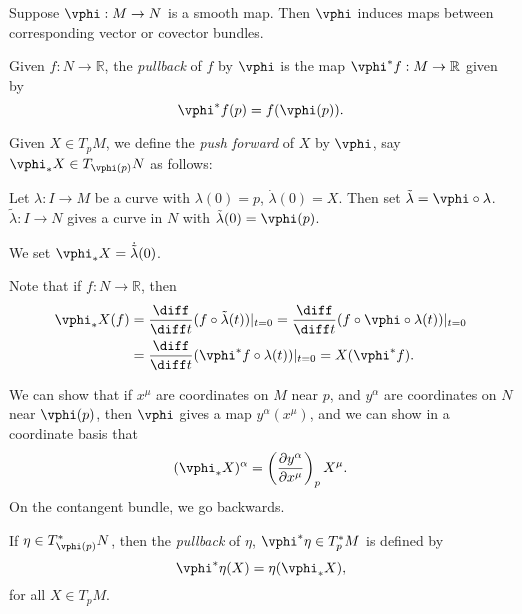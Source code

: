 \documentclass[12pt]{article}
\begin{document}
Suppose $\vphi : M \to N$ is a smooth map. Then $\vphi$ induces maps between corresponding vector or covector bundles.

\begin{definition}
	Given $f : N \to \mathbb{R}$, the \emph{pullback} of $f$ by $\vphi$ is the map $\vphi^{\ast}f : M \to \mathbb{R}$ given by
	\[
	\vphi^{\ast} f(p) = f(\vphi(p)).
	\]
\end{definition}

\begin{definition}
	Given $X \in T_pM$, we define the \emph{push forward} of $X$ by $\vphi$, say $\vphi_\ast X \in T_{\vphi(p)}N$ as follows:

	Let $\lambda : I \to M$ be a curve with $\lambda(0) = p$, $\dot \lambda(0) = X$. Then set $\tilde \lambda = \vphi \circ \lambda$. $\tilde \lambda : I \to N$ gives a curve in $N$ with $\tilde \lambda(0) = \vphi(p)$.

	We set $\vphi_\ast X = \dot{\tilde \lambda}(0)$.
\end{definition}

Note that if $f : N \to \mathbb{R}$, then
\begin{align*}
	\vphi_\ast X(f) &= \frac{\diff}{\diff t} (f \circ \tilde \lambda(t)) |_{t = 0} = \frac{\diff}{\diff t} (f \circ \vphi \circ \lambda(t)) |_{t = 0} \\
			&= \frac{\diff}{\diff t}(\vphi^{\ast} f \circ \lambda(t))|_{t = 0} = X(\vphi^{\ast} f).
\end{align*}

We can show that if $x^{\mu}$ are coordinates on $M$ near $p$, and $y^{\alpha}$ are coordinates on $N$ near $\vphi(p)$, then $\vphi$ gives a map $y^{\alpha}(x^{\mu})$, and we can show in a coordinate basis that
\[
	(\vphi_\ast X)^{\alpha} = \left( \frac{\partial y^{\alpha}}{\partial x^{\mu}} \right)_p X^{\mu}.
\]
On the contangent bundle, we go backwards.

\begin{definition}
	If $\eta \in T_{\vphi(p)}^{\ast} N$, then the \emph{pullback} of $\eta$, $\vphi^{\ast} \eta \in T_p^{\ast}M$ is defined by
	\[
	\vphi^{\ast} \eta (X) = \eta(\vphi_\ast X),
	\]
	for all $X \in T_p M$.
\end{definition}
\end{document}
